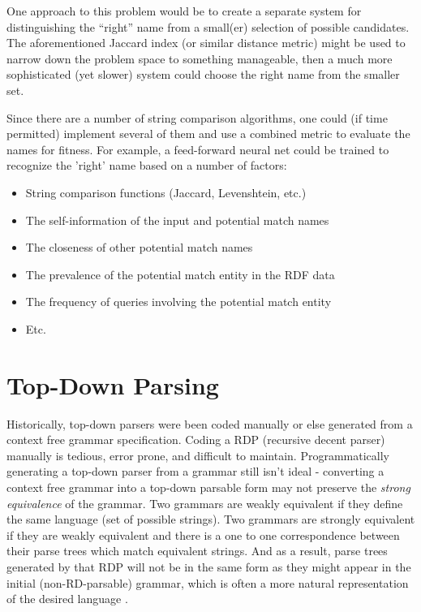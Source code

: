 \documentclass[11pt]{article}
\begin{document}
{One approach to this problem would be to create a separate
system for distinguishing the ``right'' name from a small(er) selection
of possible candidates. The aforementioned Jaccard index (or similar
distance metric) might be used to narrow down the problem space
to something manageable, then a much more sophisticated (yet slower)
system could choose the right name from the smaller set.

Since there are a number of string comparison algorithms, one could
(if time permitted) implement several of them and use a combined
metric to evaluate the names for fitness. For example,
a feed-forward neural net could be trained to recognize the 'right'
name based on a number of factors:
\begin{itemize}
\item String comparison functions (Jaccard, Levenshtein, etc.)
\item The self-information \cite{shannon} of the input and potential match names
\item The closeness of other potential match names
\item The prevalence of the potential match entity in the RDF data
\item The frequency of queries involving the potential match entity
\item Etc.
\end{itemize}

\section{Top-Down Parsing}
Historically, top-down parsers were been coded manually or else generated from 
a context free grammar specification. \cite{lewis, formal_langs} 
Coding a RDP (recursive decent parser) manually is tedious, error prone, and difficult to maintain.
Programmatically generating a top-down parser from a grammar
still isn't ideal - converting a context free grammar into
a top-down parsable form may not preserve the {\em strong equivalence} of the grammar.
Two grammars are weakly equivalent if they define the same language (set of possible strings).
Two grammars are strongly equivalent if they are weakly equivalent and there is a one to one
correspondence between their parse trees which match equivalent strings. \cite{reghizzi}
And as a result, parse trees generated by that RDP will not be in the same form
as they might appear in the initial (non-RD-parsable) grammar, which is often a more 
natural representation of the desired language \cite{compiler}.

}
\end{document}
